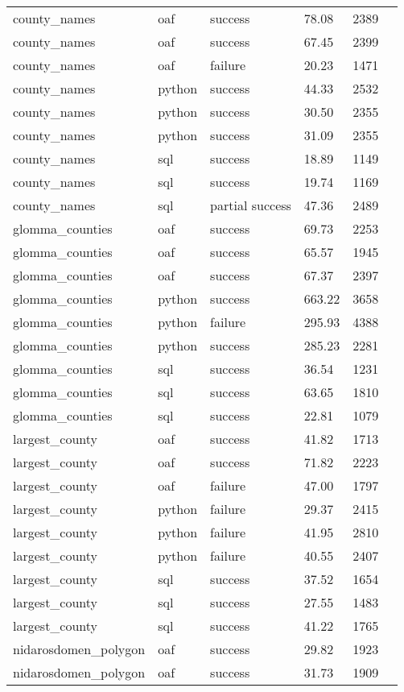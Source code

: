 \begin{longtable}{lp{1.8cm}p{1.8cm}p{1.8cm}p{1.8cm}p{1.8cm}}
county\_names & oaf & success & 78.08 & 2389 \\
county\_names & oaf & success & 67.45 & 2399 \\
county\_names & oaf & failure & 20.23 & 1471 \\
county\_names & python & success & 44.33 & 2532 \\
county\_names & python & success & 30.50 & 2355 \\
county\_names & python & success & 31.09 & 2355 \\
county\_names & sql & success & 18.89 & 1149 \\
county\_names & sql & success & 19.74 & 1169 \\
county\_names & sql & partial success & 47.36 & 2489 \\
glomma\_counties & oaf & success & 69.73 & 2253 \\
glomma\_counties & oaf & success & 65.57 & 1945 \\
glomma\_counties & oaf & success & 67.37 & 2397 \\
glomma\_counties & python & success & 663.22 & 3658 \\
glomma\_counties & python & failure & 295.93 & 4388 \\
glomma\_counties & python & success & 285.23 & 2281 \\
glomma\_counties & sql & success & 36.54 & 1231 \\
glomma\_counties & sql & success & 63.65 & 1810 \\
glomma\_counties & sql & success & 22.81 & 1079 \\
largest\_county  & oaf & success & 41.82 & 1713 \\
largest\_county  & oaf & success & 71.82 & 2223 \\
largest\_county  & oaf & failure & 47.00 & 1797 \\
largest\_county  & python & failure & 29.37 & 2415 \\
largest\_county  & python & failure & 41.95 & 2810 \\
largest\_county  & python & failure & 40.55 & 2407 \\
largest\_county  & sql & success & 37.52 & 1654 \\
largest\_county  & sql & success & 27.55 & 1483 \\
largest\_county  & sql & success & 41.22 & 1765 \\
nidarosdomen\_polygon & oaf & success & 29.82 & 1923 \\
nidarosdomen\_polygon & oaf & success & 31.73 & 1909 \\

\end{longtable}
